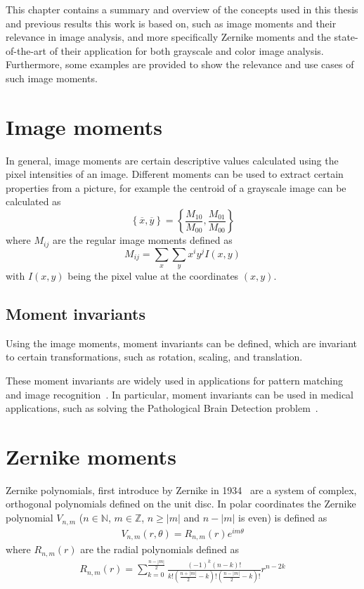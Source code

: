 This chapter contains a summary and overview of the concepts used in this thesis and previous results this work is based on, such as image moments and their relevance in image analysis, and more specifically Zernike moments and the state-of-the-art of their application for both grayscale and color image analysis. Furthermore, some examples are provided to show the relevance and use cases of such image moments.

\section{Image moments}
In general, image moments are certain descriptive values calculated using the pixel intensities of an image. Different moments can be used to extract certain properties from a picture, for example the centroid of a grayscale image can be calculated as
$$
\left\{ \overline{x}, \overline{y} \right\} = \left\{ \frac{M_{10}}{M_{00}},  \frac{M_{01}}{M_{00}} \right\}
$$ where $M_{ij}$ are the regular image moments defined as
$$
M_{ij} =  \sum_x \sum_y x^i y^j I(x,y) 
$$ with $I(x,y)$ being the pixel value at the coordinates $(x,y)$.

\subsection{Moment invariants}
Using the image moments, moment invariants can be defined, which are invariant to certain transformations, such as rotation, scaling, and translation.

These moment invariants are widely used in applications for pattern matching and image recognition~\cite{app1, app2, app3}. In particular, moment invariants can be used in medical applications, such as solving the Pathological Brain Detection problem~\cite{med_app_1}.

\section{Zernike moments}
Zernike polynomials, first introduce by Zernike in 1934~\cite{zernike} are a system of complex, orthogonal polynomials defined on the unit disc. In polar coordinates the Zernike polynomial $V_{n,m}$ ($n \in \mathds{N}$, $m \in \mathds{Z}$, $n \geq |m|$ and $n - |m|$ is even) is defined as
\begin{gather*}
  V_{n,m}(r,\theta) = R_{n,m}(r) e^{i m\theta}
\end{gather*}
where $ R_{n,m}(r) $ are the radial polynomials defined as
\begin{gather*}
  R_{n,m}(r) = \sum_{k=0}^{\frac{n - |m|}{2}}\frac{(-1)^k (n - k)!}{k!\left(\frac{n + |m|}{2} - k\right)!\left(\frac{n - |m|}{2} - k\right)!}r^{n-2k}
\end{gather*}

